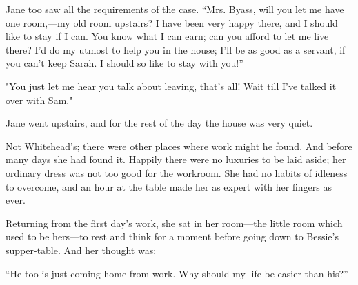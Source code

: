 Jane too saw all the requirements of the case. ``Mrs. Byass, will you
let me have one room,---my old room upstairs? I have been very happy
there, and I should like to stay if I can. You know what I can earn; can
you afford to let me live there? I'd do my utmost to help you in the
house; I'll be as good as a servant, if you can't keep Sarah. I should
so like to stay with you!''

"You just let me hear you talk about
{\protect\hypertarget{250}{}{}}leaving, that's all! Wait till I've
talked it over with Sam."

Jane went upstairs, and for the rest of the day the house was very
quiet.

Not Whitehead's; there were other places where work might he found. And
before many days she had found it. Happily there were no luxuries to be
laid aside; her ordinary dress was not too good for the workroom. She
had no habits of idleness to overcome, and an hour at the table made her
as expert with her fingers as ever.

Returning from the first day's work, she sat in her room---the little
room which used to be hers---to rest and think for a moment before going
down to Bessie's supper-table. And her thought was:

``He too is just coming home from work. Why should my life be easier
than his?''
